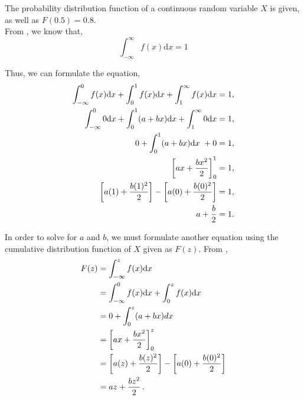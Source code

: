 %
%

\begin{subquestions}
	
\subquestion

\begin{subsubquestions}
	
\subsubquestion
The probability distribution function of a continuous random variable $X$ is given, as well as $F(0.5)=0.8.$ \\

From , we know that,
\begin{equation}
	 \int_{-\infty}^{\infty} f(x)\mathrm{d}x = 1
\end{equation}


Thus, we can formulate the equation,
\begin{align}
	\int_{-\infty}^{0} f(x)\mathrm{d}x+ \int_{0}^{1} f(x)\mathrm{d}x + \int_{1}^{\infty} f(x)\mathrm{d}x = 1, \nonumber \\
	\int_{-\infty}^{0} 0\mathrm{d}x+ \int_{0}^{1} (a+bx)\mathrm{d}x + \int_{1}^{\infty} 0\mathrm{d}x = 1, \nonumber \\
	0+ \int_{0}^{1} (a+bx)\mathrm{d}x ~+ 0 = 1, \nonumber \\
	\left[ax + \frac{bx^2}{2}\right]_0^1 = 1, \nonumber \\
	\left[a(1) + \frac{b(1)^2}{2}\right] - \left[a(0) + \frac{b(0)^2}{2}\right]= 1, \nonumber \\
	a + \frac{b}{2} = 1. \label{2015:q4:eqn:crv1}
\end{align}

In order to solve for $a$ and $b$, we must formulate another equation using the cumulative distribution function of $X$ given as $F(z)$. From , 
\begin{align}
	F(z) & = \int_{-\infty}^{z} f(x)\mathrm{d}x \nonumber \\
	     & = \int_{-\infty}^{0} f(x)\mathrm{d}x + \int_{0}^{z} f(x)\mathrm{d}x \nonumber \\
	     & = 0 + \int_{0}^{z} (a+bx)dx \nonumber \\
	     & = \left[ax + \frac{bx^2}{2}\right]_0^z \nonumber \\
	     & = \left[a(z) + \frac{b(z)^2}{2}\right] - \left[a(0) + \frac{b(0)^2}{2}\right] \nonumber \\
	     & = az + \frac{bz^2}{2} \,.
\end{align}


\end{subsubquestions}
\end{subquestions}
